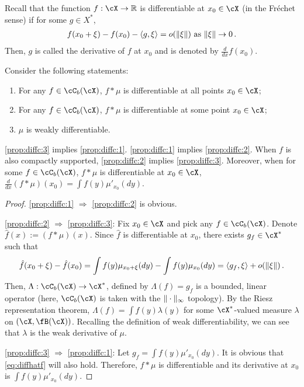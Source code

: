 \documentclass[11pt,letterpaper,english]{article}
\newcommand{\Borel}{\fB}
\newcommand{\Cb}{\cC_b}
\begin{document}
Recall that the function $f: \cX \to \R$ is differentiable at $x_0\in \cX$ (in the Fr\'echet sense) if 
for some $g\in X^*$,
\begin{align*}
f(x_0+\xi) - f(x_0) - \langle g,\xi \rangle = o(\|\xi\|) \text{ as } \|\xi\| \to 0\,.
\end{align*}
Then, $g$ is called the derivative of $f$ at $x_0$ and is denoted by $\frac{d}{dx}f(x_0)$.
\begin{proposition}
\label{prop:diffconvolution}
Consider the following statements:
\begin{enumerate}
\item \label{prop:diffc:1}
	 For any $f \in \Cb(\cX)$, $f*\mu$ is differentiable at all points $x_0\in \cX$; 
\item \label{prop:diffc:2}
	 For any $f \in \Cb(\cX)$, $f*\mu$ is differentiable at some point $x_0\in \cX$; 
\item \label{prop:diffc:3}
	 $\mu$ is weakly differentiable. 
\end{enumerate}
\eqref{prop:diffc:3} implies \eqref{prop:diffc:1}. \eqref{prop:diffc:1} implies \eqref{prop:diffc:2}. When $f$ is also compactly supported, \eqref{prop:diffc:2} implies \eqref{prop:diffc:3}.
Moreover, when  for some $f\in \Cb(\cX)$, $f*\mu$ is differentiable at $x_0\in \cX$,
$\frac{d}{dx} (f*\mu) (x_0) = \int f(y)\mu'_{x_0}(dy)$.
\end{proposition}
\begin{proof}
 \eqref{prop:diffc:1} $\Rightarrow$ \eqref{prop:diffc:2} is obvious.
 
 \eqref{prop:diffc:2} $\Rightarrow$ \eqref{prop:diffc:3}:
 Fix $x_0\in \cX$ and pick any $f\in\Cb(\cX)$.
Denote $\hat{f}(x) := (f*\mu)(x)$. 
Since $\hat{f}$ is differentiable at $x_0$, there exists $g_f \in \cX^*$ such that
\begin{align}
\label{eq:diffhatf}
\hat{f}(x_0+\xi) - \hat{f}(x_0) 
= \int f(y)\mu_{x_0+\xi}(dy) - \int f(y)\mu_{x_0}(dy)
= \langle g_f, \xi \rangle+o(\|\xi\|) \,.
\end{align}
Then, $\Lambda:\Cb(\cX) \to \cX^*$, defined by $\Lambda(f)= g_f$ is a bounded, linear operator (here, $\Cb(\cX)$ is taken with the $\|\cdot\|_\infty$ topology). By the Riesz representation theorem,   
$\Lambda(f) = \int f(y) \lambda(y)$ for some $\cX^*$-valued measure $\lambda$ on $(\cX,\Borel(\cX))$.
Recalling the definition of weak differentiability, we can see that $\lambda$ is the weak derivative of $\mu$. 

 \eqref{prop:diffc:3} $\Rightarrow$ \eqref{prop:diffc:1}:
Let $g_f=\int f(y)\mu'_{x_0}(dy)$. It is obvious that \eqref{eq:diffhatf} will also hold. 
Therefore, $f*\mu$ is differentiable and its derivative  at $x_0$ is $\int f(y)\mu'_{x_0}(dy)$.
\end{proof}
\end{document}

